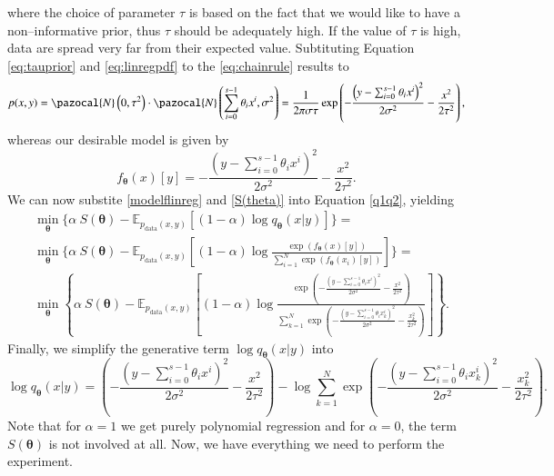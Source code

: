 where the choice of parameter $\tau$ is based on the fact that we would like to have a non--informative prior, thus $\tau$ should be adequately high. If the value of $\tau$ is high, data are spread very far from their expected value.  Subtituting Equation \eqref{eq:tauprior} and \eqref{eq:linregpdf} to the \eqref{eq:chainrule} results to
\begin{equation}
	p(x,y) = \pazocal{N}\left(0,\tau^2\right) \cdot \pazocal{N}\left(\sum_{i=0}^{s-1} \theta_i x^i, \sigma^2 \right)  =  \frac{1}{2\pi\sigma\tau}\exp\left(-\frac{\left(y-\sum_{i=0}^{s-1} \theta_i x^i\right)^2}{2\sigma^2}-\frac{x^2}{2\tau^2}\right),
\end{equation}
whereas our desirable model is given by
\begin{equation}\label{modelflinreg}
	f_{\boldsymbol{\theta}}(x)[y] = -\frac{\left(y-\sum_{i=0}^{s-1} \theta_i x^i\right)^2}{2\sigma^2} - \frac{x^2}{2\tau^2}.
\end{equation}
We can now substite \eqref{modelflinreg} and \eqref{S(theta)} into Equation \eqref{q1q2}, yielding
\begin{align}\label{eq:SSEq}
	&\min_{\boldsymbol{\theta}}\Big\lbrace \alpha~S(\boldsymbol{\theta}) - \mathbb{E}_{p_{\mathrm{data}}(x,y)}\left[ \left(1-\alpha\right)\log q_{\boldsymbol{\theta}}\left(x|y\right) \right] \Big\rbrace  =\\
	&\min_{\boldsymbol{\theta}}\Bigg\lbrace \alpha~S(\boldsymbol{\theta}) - \mathbb{E}_{p_{\mathrm{data}}(x,y)}\left[ \left(1-\alpha\right)\log \frac{\exp\left({f_{\boldsymbol{\theta}}\left(x\right)[y]}\right)}{\sum_{i=1}^N\exp\left({f_{\boldsymbol{\theta}}\left(x_i\right)[y]}\right)} \right] \Bigg\rbrace  =\\
	&\min_{\boldsymbol{\theta}}\left\lbrace \alpha~S(\boldsymbol{\theta}) - \mathbb{E}_{p_{\mathrm{data}}(x,y)}\left[ \left(1-\alpha\right)\log \frac{\exp\left({-\frac{\left(y- \sum_{i=0}^{s-1} \theta_i x^i     \right)^2}{2\sigma^2} - \frac{x^2}{2\tau^2}}\right)}{\sum_{k=1}^N\exp\left({-\frac{\left(y-\sum_{i=0}^{s-1} \theta_i x_k^i\right)^2}{2\sigma^2} - \frac{x_k^2}{2\tau^2}}\right)} \right] \right\rbrace.  
\end{align}
Finally, we simplify the generative term $\log q_{\boldsymbol{\theta}}\left(x|y\right)$ into
\begin{equation}
	\log q_{\boldsymbol{\theta}}\left(x|y\right) =  \left(-\frac{\left(y-\sum_{i=0}^{s-1} \theta_i x^i\right)^2}{2\sigma^2} - \frac{x^2}{2\tau^2}\right) - \log \sum_{k=1}^N\exp\left({-\frac{\left(y-\sum_{i=0}^{s-1} \theta_i x_k^i\right)^2}{2\sigma^2} - \frac{x_k^2}{2\tau^2}}\right).
\end{equation}
Note that for $\alpha =1$ we get purely polynomial regression and for $\alpha =0$, the term $S(\boldsymbol{\theta})$ is not involved at all. Now, we have everything we need to perform the experiment.
